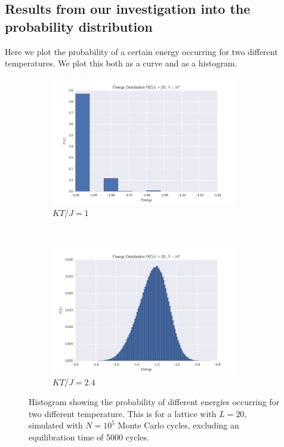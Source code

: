 \documentclass[a4paper, 10pt]{article}
\begin{document}
\subsection{Results from our investigation into the probability distribution}
Here we plot the probability of a certain energy occurring for two different temperatures. We plot this both as a curve and as a histogram.
\begin{figure}[!ht]
    \centering
    \begin{subfigure}[H!]{0.5\textwidth}
        \centering
        \includegraphics[height=2.2in]{energyDistHistoT1.png}
        \caption{$KT/J=1$}
    \end{subfigure}%
    ~ 
    \begin{subfigure}[H!]{0.5\textwidth}
        \centering
        \includegraphics[height=2.2in]{energyDistHisto.png}
        \caption{$KT/J=2.4$}
    \end{subfigure}
       \caption{Histogram showing the probability of different energies occurring for two different temperature. This is for a lattice with $L=20$, simulated with $N=10^5$ Monte Carlo cycles, excluding an equilibration time of 5000 cycles. }
\end{figure}
\end{document}
